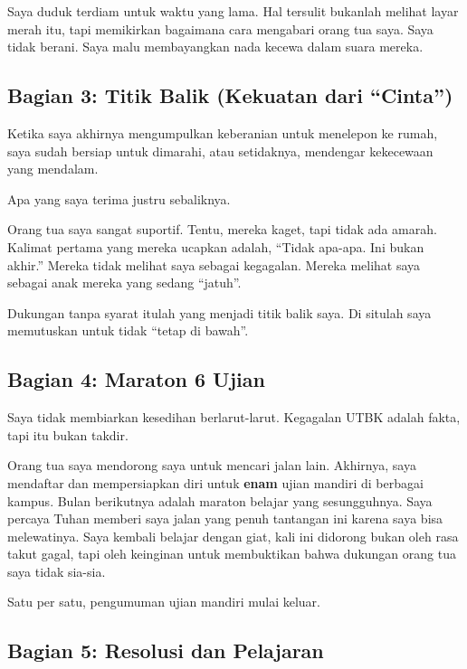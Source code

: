 \documentclass[
  letterpaper,
  DIV=11,
  numbers=noendperiod]{scrreprt}
\begin{document}
Saya duduk terdiam untuk waktu yang lama. Hal tersulit bukanlah melihat
layar merah itu, tapi memikirkan bagaimana cara mengabari orang tua
saya. Saya tidak berani. Saya malu membayangkan nada kecewa dalam suara
mereka.

\subsection{Bagian 3: Titik Balik (Kekuatan dari
``Cinta'')}\label{bagian-3-titik-balik-kekuatan-dari-cinta}

Ketika saya akhirnya mengumpulkan keberanian untuk menelepon ke rumah,
saya sudah bersiap untuk dimarahi, atau setidaknya, mendengar kekecewaan
yang mendalam.

Apa yang saya terima justru sebaliknya.

Orang tua saya sangat suportif. Tentu, mereka kaget, tapi tidak ada
amarah. Kalimat pertama yang mereka ucapkan adalah, ``Tidak apa-apa. Ini
bukan akhir.'' Mereka tidak melihat saya sebagai kegagalan. Mereka
melihat saya sebagai anak mereka yang sedang ``jatuh''.

Dukungan tanpa syarat itulah yang menjadi titik balik saya. Di situlah
saya memutuskan untuk tidak ``tetap di bawah''.

\subsection{Bagian 4: Maraton 6 Ujian}\label{bagian-4-maraton-6-ujian}

Saya tidak membiarkan kesedihan berlarut-larut. Kegagalan UTBK adalah
fakta, tapi itu bukan takdir.

Orang tua saya mendorong saya untuk mencari jalan lain. Akhirnya, saya
mendaftar dan mempersiapkan diri untuk \textbf{enam} ujian mandiri di
berbagai kampus. Bulan berikutnya adalah maraton belajar yang
sesungguhnya. Saya percaya Tuhan memberi saya jalan yang penuh tantangan
ini karena saya bisa melewatinya. Saya kembali belajar dengan giat, kali
ini didorong bukan oleh rasa takut gagal, tapi oleh keinginan untuk
membuktikan bahwa dukungan orang tua saya tidak sia-sia.

Satu per satu, pengumuman ujian mandiri mulai keluar.

\subsection{Bagian 5: Resolusi dan
Pelajaran}\label{bagian-5-resolusi-dan-pelajaran}
\end{document}
